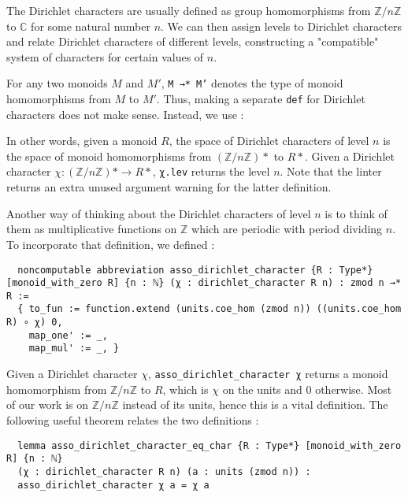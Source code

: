 \documentclass[a4paper,UKenglish,cleveref, autoref, thm-restate]{lipics-v2021}
\newcommand{\lean}[1]{\texttt{#1}\xspace} %
\begin{document}
The Dirichlet characters are usually defined as group homomorphisms from $\mathbb{Z}/n \mathbb{Z}$ to $\mathbb{C}$ for some natural number $n$. 
We can then assign levels to Dirichlet characters and relate Dirichlet characters of different levels, constructing a "compatible" system of 
characters for certain values of $n$. 

For any two monoids $M$ and $M'$, \lean{M →* M'} denotes the type of monoid homomorphisms from $M$ to $M'$. Thus, making a separate 
\lean{def} for Dirichlet characters does not make sense. Instead, we use :

In other words, given a monoid $R$, the space of Dirichlet characters of level $n$ is the space of monoid homomorphisms from 
$(\mathbb{Z}/n \mathbb{Z})*$ to $R*$. Given a Dirichlet character $\chi : (\mathbb{Z}/n \mathbb{Z})* \to R*$, \lean{χ.lev} 
returns the level $n$. Note that the linter returns an extra unused argument warning for the latter definition. 

Another way of thinking about the Dirichlet characters of level $n$ is to think of them as multiplicative functions on $\mathbb{Z}$ 
which are periodic with period dividing $n$. To incorporate that definition, we defined : 
\begin{lstlisting}
  noncomputable abbreviation asso_dirichlet_character {R : Type*} [monoid_with_zero R] {n : ℕ} (χ : dirichlet_character R n) : zmod n →* R :=
  { to_fun := function.extend (units.coe_hom (zmod n)) ((units.coe_hom R) ∘ χ) 0,
    map_one' := _,
    map_mul' := _, }
\end{lstlisting}

Given a Dirichlet character $\chi$, \lean{asso\_dirichlet\_character χ} returns a monoid homomorphism from $\mathbb{Z}/n \mathbb{Z}$ 
to $R$, which is $\chi$ on the units and 0 otherwise. Most of our work is on $\mathbb{Z}/n \mathbb{Z}$ instead of its units, hence this 
is a vital definition. The following useful theorem relates the two definitions :
\begin{lstlisting}
  lemma asso_dirichlet_character_eq_char {R : Type*} [monoid_with_zero R] {n : ℕ}
  (χ : dirichlet_character R n) (a : units (zmod n)) : 
  asso_dirichlet_character χ a = χ a 
\end{lstlisting}
\end{document}

